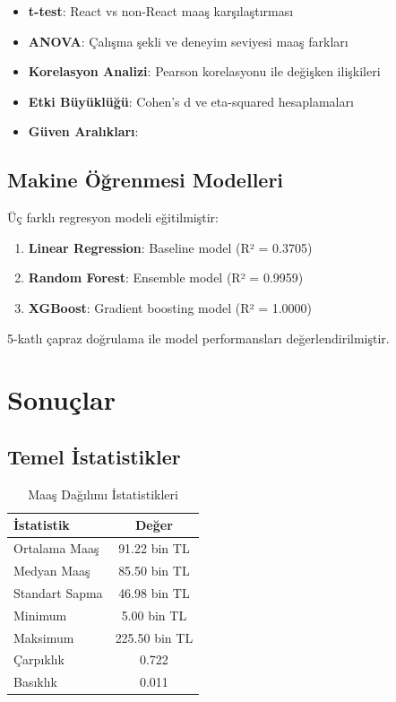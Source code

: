 \documentclass[12pt,a4paper]{article}
\begin{document}
\begin{itemize}
    \item \textbf{t-test}: React vs non-React maaş karşılaştırması
    \item \textbf{ANOVA}: Çalışma şekli ve deneyim seviyesi maaş farkları
    \item \textbf{Korelasyon Analizi}: Pearson korelasyonu ile değişken ilişkileri
    \item \textbf{Etki Büyüklüğü}: Cohen's d ve eta-squared hesaplamaları
    \item \textbf{Güven Aralıkları}: %
\end{itemize}

\subsection{Makine Öğrenmesi Modelleri}
Üç farklı regresyon modeli eğitilmiştir:

\begin{enumerate}
    \item \textbf{Linear Regression}: Baseline model (R² = 0.3705)
    \item \textbf{Random Forest}: Ensemble model (R² = 0.9959)
    \item \textbf{XGBoost}: Gradient boosting model (R² = 1.0000)
\end{enumerate}

5-katlı çapraz doğrulama ile model performansları değerlendirilmiştir.

\section{Sonuçlar}

\subsection{Temel İstatistikler}
\begin{table}[H]
\centering
\caption{Maaş Dağılımı İstatistikleri}
\begin{tabular}{lc}
\toprule
\textbf{İstatistik} & \textbf{Değer} \\
\midrule
Ortalama Maaş & 91.22 bin TL \\
Medyan Maaş & 85.50 bin TL \\
Standart Sapma & 46.98 bin TL \\
Minimum & 5.00 bin TL \\
Maksimum & 225.50 bin TL \\
Çarpıklık & 0.722 \\
Basıklık & 0.011 \\
\bottomrule
\end{tabular}
\end{table}
\end{document}
